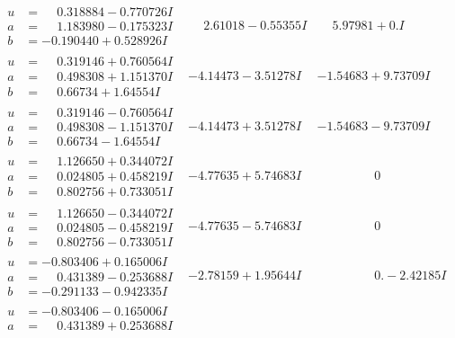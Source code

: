 \documentclass[1p]{elsarticle_modified}
\theoremstyle{definition}
\begin{document}
$$\begin{array}{c|c|c}
\begin{aligned}
u &= \phantom{-}0.318884 - 0.770726 I \\
a &= \phantom{-}1.183980 - 0.175323 I \\
b &= -0.190440 + 0.528926 I\end{aligned}
 & \phantom{-}2.61018 - 0.55355 I & \phantom{-}5.97981 + 0. I\phantom{ +0.000000I} \\ \hline\begin{aligned}
u &= \phantom{-}0.319146 + 0.760564 I \\
a &= \phantom{-}0.498308 + 1.151370 I \\
b &= \phantom{-}0.66734 + 1.64554 I\end{aligned}
 & -4.14473 - 3.51278 I & -1.54683 + 9.73709 I \\ \hline\begin{aligned}
u &= \phantom{-}0.319146 - 0.760564 I \\
a &= \phantom{-}0.498308 - 1.151370 I \\
b &= \phantom{-}0.66734 - 1.64554 I\end{aligned}
 & -4.14473 + 3.51278 I & -1.54683 - 9.73709 I \\ \hline\begin{aligned}
u &= \phantom{-}1.126650 + 0.344072 I \\
a &= \phantom{-}0.024805 + 0.458219 I \\
b &= \phantom{-}0.802756 + 0.733051 I\end{aligned}
 & -4.77635 + 5.74683 I & \phantom{-0.000000 } 0 \\ \hline\begin{aligned}
u &= \phantom{-}1.126650 - 0.344072 I \\
a &= \phantom{-}0.024805 - 0.458219 I \\
b &= \phantom{-}0.802756 - 0.733051 I\end{aligned}
 & -4.77635 - 5.74683 I & \phantom{-0.000000 } 0 \\ \hline\begin{aligned}
u &= -0.803406 + 0.165006 I \\
a &= \phantom{-}0.431389 - 0.253688 I \\
b &= -0.291133 - 0.942335 I\end{aligned}
 & -2.78159 + 1.95644 I & \phantom{-0.000000 } 0. - 2.42185 I \\ \hline\begin{aligned}
u &= -0.803406 - 0.165006 I \\
a &= \phantom{-}0.431389 + 0.253688 I \\

\end{aligned}
\end{array}$$
\end{document}
